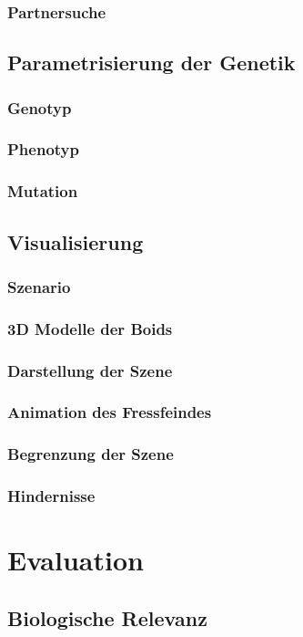 \documentclass[draft=false
              ,paper=a4
              ,twoside=false
              ,fontsize=11pt
              ,headsepline
              ,BCOR10mm
              ,DIV11
              ,bibtotoc
              ,liststotoc
              ]{scrbook}
\begin{document}
\subsection{Partnersuche}
\section{Parametrisierung der Genetik}
\subsection{Genotyp}
\subsection{Phenotyp}
\subsection{Mutation}
\section{Visualisierung}
\subsection{Szenario}
\subsection{3D Modelle der Boids}
\subsection{Darstellung der Szene}
\subsection{Animation des Fressfeindes}
\subsection{Begrenzung der Szene}
\subsection{Hindernisse}

\chapter{Evaluation}\label{eval}
\section{Biologische Relevanz}
\end{document}
